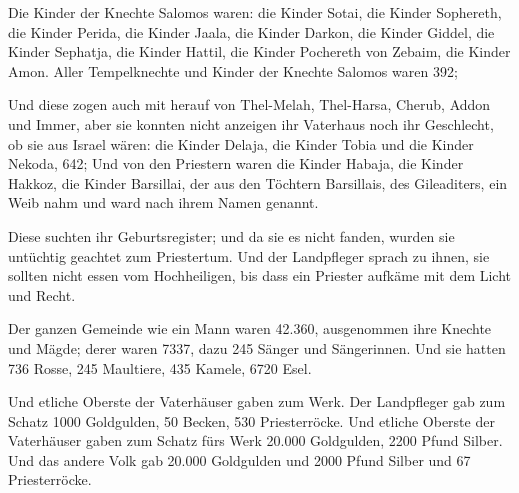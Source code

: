  Die Kinder der Knechte Salomos waren: die Kinder Sotai,
die Kinder Sophereth, die Kinder Perida,  die Kinder
Jaala, die Kinder Darkon, die Kinder Giddel,  die Kinder
Sephatja, die Kinder Hattil, die Kinder Pochereth von Zebaim, die Kinder
Amon.  Aller Tempelknechte und Kinder der Knechte Salomos
waren 392;

 Und diese zogen auch mit herauf von Thel-Melah,
Thel-Harsa, Cherub, Addon und Immer, aber sie konnten nicht anzeigen ihr
Vaterhaus noch ihr Geschlecht, ob sie aus Israel wären: 
die Kinder Delaja, die Kinder Tobia und die Kinder Nekoda, 642;
 Und von den Priestern waren die Kinder Habaja, die
Kinder Hakkoz, die Kinder Barsillai, der aus den Töchtern Barsillais,
des Gileaditers, ein Weib nahm und ward nach ihrem Namen genannt.

 Diese suchten ihr Geburtsregister; und da sie es nicht
fanden, wurden sie untüchtig geachtet zum Priestertum. 
Und der Landpfleger sprach zu ihnen, sie sollten nicht essen vom
Hochheiligen, bis dass ein Priester aufkäme mit dem Licht und Recht.

 Der ganzen Gemeinde wie ein Mann waren 42.360,
 ausgenommen ihre Knechte und Mägde; derer waren 7337,
dazu 245 Sänger und Sängerinnen.  Und sie hatten 736
Rosse, 245 Maultiere,  435 Kamele, 6720 Esel.

 Und etliche Oberste der Vaterhäuser gaben zum Werk. Der
Landpfleger gab zum Schatz 1000 Goldgulden, 50 Becken, 530
Priesterröcke.  Und etliche Oberste der Vaterhäuser gaben
zum Schatz fürs Werk 20.000 Goldgulden, 2200 Pfund Silber.
 Und das andere Volk gab 20.000 Goldgulden und 2000 Pfund
Silber und 67 Priesterröcke.

